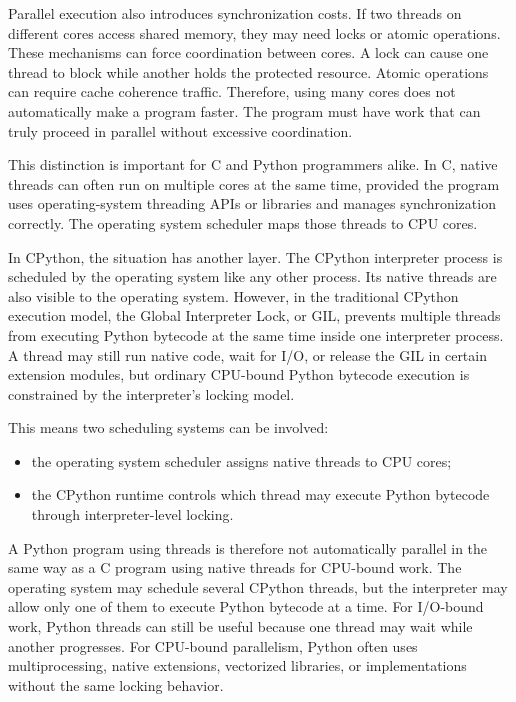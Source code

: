 Parallel execution also introduces synchronization costs. If two threads on different cores access shared memory, they may need locks or atomic operations. These mechanisms can force coordination between cores. A lock can cause one thread to block while another holds the protected resource. Atomic operations can require cache coherence traffic. Therefore, using many cores does not automatically make a program faster. The program must have work that can truly proceed in parallel without excessive coordination.

This distinction is important for C and Python programmers alike. In C, native threads can often run on multiple cores at the same time, provided the program uses operating-system threading APIs or libraries and manages synchronization correctly. The operating system scheduler maps those threads to CPU cores.

In CPython, the situation has another layer. The CPython interpreter process is scheduled by the operating system like any other process. Its native threads are also visible to the operating system. However, in the traditional CPython execution model, the Global Interpreter Lock, or GIL, prevents multiple threads from executing Python bytecode at the same time inside one interpreter process. A thread may still run native code, wait for I/O, or release the GIL in certain extension modules, but ordinary CPU-bound Python bytecode execution is constrained by the interpreter's locking model.

This means two scheduling systems can be involved:

\begin{itemize}
    \item the operating system scheduler assigns native threads to CPU cores;
    \item the CPython runtime controls which thread may execute Python bytecode through interpreter-level locking.
\end{itemize}

A Python program using threads is therefore not automatically parallel in the same way as a C program using native threads for CPU-bound work. The operating system may schedule several CPython threads, but the interpreter may allow only one of them to execute Python bytecode at a time. For I/O-bound work, Python threads can still be useful because one thread may wait while another progresses. For CPU-bound parallelism, Python often uses multiprocessing, native extensions, vectorized libraries, or implementations without the same locking behavior.

